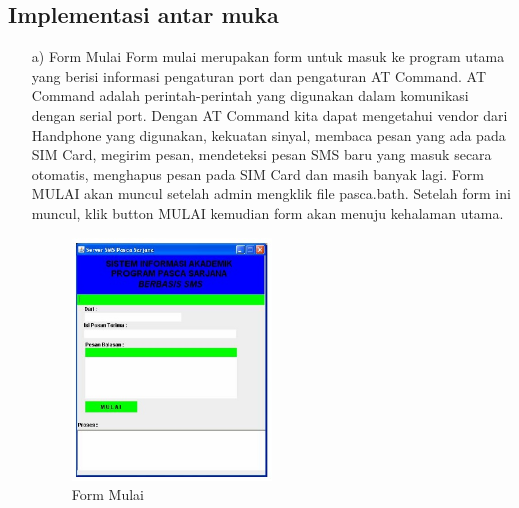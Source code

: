 \documentclass{jtetiproposalskripsi}
\begin{document}
\subsection{Implementasi antar muka}
\begin{itemize}
\item[a)]Form Mulai
Form mulai merupakan form untuk masuk ke program utama yang berisi informasi pengaturan port dan pengaturan AT Command. AT Command adalah perintah-perintah yang digunakan dalam komunikasi dengan serial port. Dengan AT Command kita dapat mengetahui vendor dari Handphone yang digunakan, kekuatan sinyal, membaca pesan yang ada pada SIM Card, megirim pesan, mendeteksi pesan SMS baru yang masuk secara otomatis, menghapus pesan pada SIM Card dan masih banyak lagi. Form MULAI akan muncul setelah admin mengklik file pasca.bath. Setelah form ini muncul, klik button MULAI kemudian form akan menuju kehalaman utama.
\begin{figure}[ht!]
  \centering
    \includegraphics[width=0.5\textwidth]{gambar/7}
    \caption{Form Mulai}
    \label{wsn}
\end{figure}
\newpage


\end{itemize}
\end{document}
